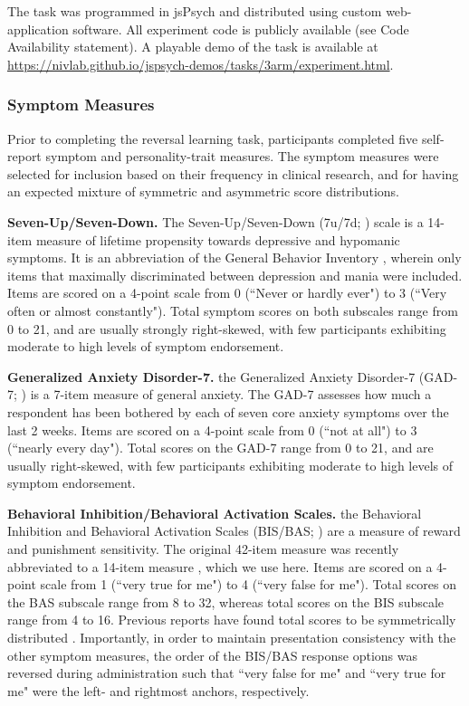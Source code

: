 \documentclass[a4paper,notitlepage,12pt]{article}
\begin{document}
\begin{refsection}[main]
The task was programmed in jsPsych \cite{deleeuw_2015_jspsych} and distributed using custom web-application software. All experiment code is publicly available (see Code Availability statement). A playable demo of the task is available at \url{https://nivlab.github.io/jspsych-demos/tasks/3arm/experiment.html}.

\subsubsection*{Symptom Measures}

Prior to completing the reversal learning task, participants completed five self-report symptom and personality-trait measures. The symptom measures were selected for inclusion based on their frequency in clinical research, and for having an expected mixture of symmetric and asymmetric score distributions. 

\textbf{Seven-Up/Seven-Down.} The Seven-Up/Seven-Down (7u/7d; \cite{youngstrom_2013_susd}) scale is a 14-item measure of lifetime propensity towards depressive and hypomanic symptoms. It is an abbreviation of the General Behavior Inventory \cite{depue1981behavioral}, wherein only items that maximally discriminated between depression and mania were included. Items are scored on a 4-point scale from 0 (``Never or hardly ever") to 3 (``Very often or almost constantly"). Total symptom scores on both subscales range from 0 to 21, and are usually strongly right-skewed, with few participants exhibiting moderate to high levels of symptom endorsement. 

\textbf{Generalized Anxiety Disorder-7.} the Generalized Anxiety Disorder-7 (GAD-7; \cite{spitzer2006brief}) is a 7-item measure of general anxiety. The GAD-7 assesses how much a respondent has been bothered by each of seven core anxiety symptoms over the last 2 weeks. Items are scored on a 4-point scale from 0 (``not at all") to 3 (``nearly every day"). Total scores on the GAD-7 range from 0 to 21, and are usually right-skewed, with few participants exhibiting moderate to high levels of symptom endorsement.

\textbf{Behavioral Inhibition/Behavioral Activation Scales.} the Behavioral Inhibition and Behavioral Activation Scales (BIS/BAS; \cite{carver1994behavioral}) are a measure of reward and punishment sensitivity. The original 42-item measure was recently abbreviated to a 14-item measure \cite{pagliaccio2016revising}, which we use here. Items are scored on a 4-point scale from 1 (``very true for me") to 4 (``very false for me"). Total scores on the BAS subscale range from 8 to 32, whereas total scores on the BIS subscale range from 4 to 16. Previous reports have found total scores to be symmetrically distributed \cite{cooper2007behavioural}. Importantly, in order to maintain presentation consistency with the other symptom measures, the order of the BIS/BAS response options was reversed during administration such that ``very false for me" and ``very true for me" were the left- and rightmost anchors, respectively. 


\end{refsection}
\end{document}
